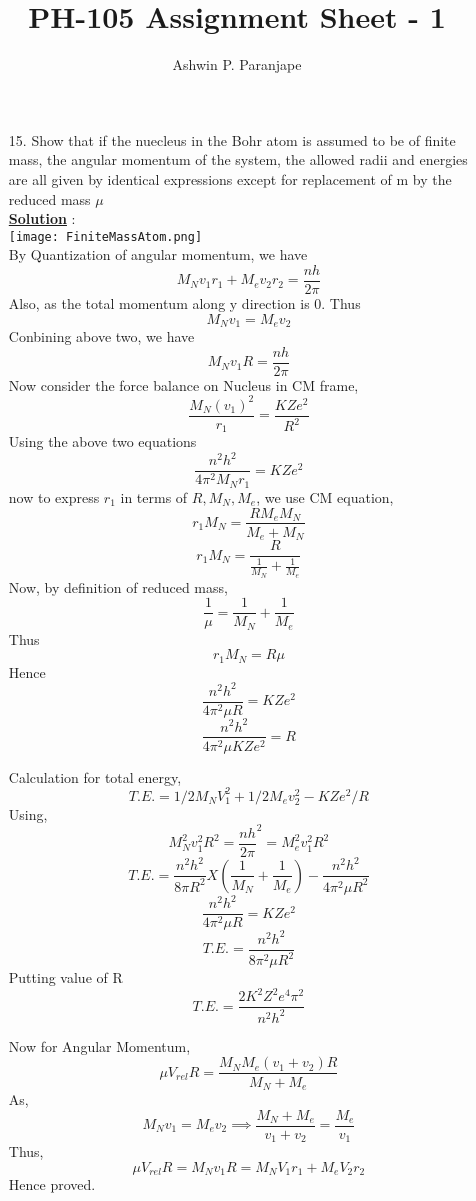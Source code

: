 \documentclass[10pt, a4paper]{article}
\begin{document}
\title{PH-105 Assignment Sheet - 1}
\author{Ashwin P. Paranjape}
\date{}
\maketitle
\begin{enumerate}
\item[15.]{Show that if the nuecleus in the Bohr atom is assumed to be of finite mass, the angular momentum of the system, the allowed radii and energies are all given by identical expressions except for replacement of m by the reduced mass $\mu$} \\
{\underline {\bf Solution}} : \\
\texttt{[image: FiniteMassAtom.png]}
\\
By Quantization of angular momentum, we have
\[M_N v_1 r_1 + M_e v_2 r_2 = \frac{n h }{2 \pi}\]
Also, as the total momentum along y direction is 0. Thus
\[M_N v_1 = M_e v_2\]
Conbining above two, we have
\[M_N v_1 R = \frac{nh}{2\pi}\]
Now consider the force balance on Nucleus in CM frame,
\[\frac{M_N (v_1)^2 }{r_1}=\frac{KZe^2}{R^2}\]
Using the above two equations
\[\frac{n^2 h^2 }{4\pi^2 M_N r_1}={KZe^2}\]
now to express $r_1$ in terms of $R,M_N,M_e$, we use CM equation,
\[r_1 M_N = \frac{RM_eM_N}{M_e + M_N}\]
\[r_1 M_N = \frac{R}{\frac{1}{M_N}+\frac{1}{M_e}}\]
Now, by definition of reduced mass,
\[\frac{1}{\mu}=\frac{1}{M_N}+\frac{1}{M_e}\]
Thus
\[r_1 M_N = R\mu\]
Hence
\[\frac{n^2 h^2 }{4\pi^2 \mu R}={KZe^2}\]
\[\frac{n^2 h^2 }{4\pi^2 \mu  KZe^2}={R}\]

Calculation for total energy,
\[T.E. = 1/2 M_N V_1^2 + 1/2 M_e v_2^2 - KZe^2/R\]
Using,
\[M_N^2 v_1^2 R^2 = \frac{nh}{2\pi}^2 = M_e^2 v_1^2 R^2\]
\[T.E. = \frac{n^2h^2}{8\pi R^2}X(\frac{1}{M_N}+\frac{1}{M_e}) - \frac{n^2 h^2 }{4\pi^2 \mu R^2}\]
\[\frac{n^2 h^2 }{4\pi^2 \mu R}={KZe^2}\]
\[T.E. = \frac{n^2h^2}{8 \pi^2 \mu R^2}\]
Putting value of R
\[T.E. = \frac{2 K^2 Z^2 e^4 \pi^2}{n^2 h^2}\]

Now for Angular Momentum,
\[\mu V_{rel} R = \frac{M_N M_e (v_1 + v_2)R}{M_N+M_e}\]
As,
\[M_N v_1 = M_e v_2 \implies \frac{M_N+M_e}{v_1+v_2}=\frac{M_e}{v_1}\]
Thus,
\[\mu V_{rel} R = M_N v_1 R = M_N V_1 r_1 + M_e V_2 r_2\]
Hence proved.
\end{enumerate}
\end{document}
